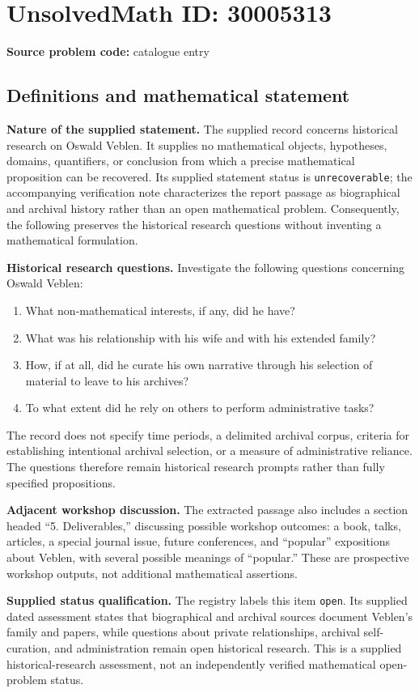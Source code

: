 \documentclass[11pt]{article}
\begin{document}
\section*{UnsolvedMath ID: 30005313}
\textbf{Source problem code:} catalogue entry
\subsection{Definitions and mathematical statement}
\textbf{Nature of the supplied statement.} The supplied record concerns historical research on Oswald Veblen. It supplies no mathematical objects, hypotheses, domains, quantifiers, or conclusion from which a precise mathematical proposition can be recovered. Its supplied statement status is \texttt{unrecoverable}; the accompanying verification note characterizes the report passage as biographical and archival history rather than an open mathematical problem. Consequently, the following preserves the historical research questions without inventing a mathematical formulation.

\textbf{Historical research questions.} Investigate the following questions concerning Oswald Veblen:
\begin{enumerate}
\item What non-mathematical interests, if any, did he have?
\item What was his relationship with his wife and with his extended family?
\item How, if at all, did he curate his own narrative through his selection of material to leave to his archives?
\item To what extent did he rely on others to perform administrative tasks?
\end{enumerate}
The record does not specify time periods, a delimited archival corpus, criteria for establishing intentional archival selection, or a measure of administrative reliance. The questions therefore remain historical research prompts rather than fully specified propositions.

\textbf{Adjacent workshop discussion.} The extracted passage also includes a section headed ``5. Deliverables,'' discussing possible workshop outcomes: a book, talks, articles, a special journal issue, future conferences, and ``popular'' expositions about Veblen, with several possible meanings of ``popular.'' These are prospective workshop outputs, not additional mathematical assertions.

\textbf{Supplied status qualification.} The registry labels this item \texttt{open}. Its supplied dated assessment states that biographical and archival sources document Veblen's family and papers, while questions about private relationships, archival self-curation, and administration remain open historical research. This is a supplied historical-research assessment, not an independently verified mathematical open-problem status.
\end{document}
